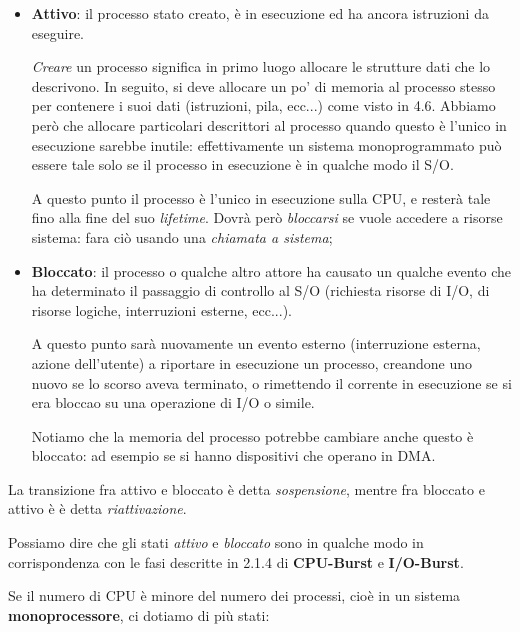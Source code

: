\documentclass[a4paper,11pt]{article}
\begin{document}
\begin{itemize}
	\item \textbf{Attivo}: il processo stato creato, è in esecuzione ed ha ancora istruzioni da eseguire. 

		\textit{Creare} un processo significa in primo luogo allocare le strutture dati che lo descrivono. In seguito, si deve allocare un po' di memoria al processo stesso per contenere i suoi dati (istruzioni, pila, ecc...) come visto in 4.6.
	Abbiamo però che allocare particolari descrittori al processo quando questo è l'unico in esecuzione sarebbe inutile: effettivamente un sistema monoprogrammato può essere tale solo se il processo in esecuzione è in qualche modo il S/O.

		A questo punto il processo è l'unico in esecuzione sulla CPU, e resterà tale fino alla fine del suo \textit{lifetime}.
		Dovrà però \textit{bloccarsi} se vuole accedere a risorse sistema: fara ciò usando una \textit{chiamata a sistema};

	\item \textbf{Bloccato}: il processo o qualche altro attore ha causato un qualche evento che ha determinato il passaggio di controllo al S/O (richiesta risorse di I/O, di risorse logiche, interruzioni esterne, ecc...).

		A questo punto sarà nuovamente un evento esterno (interruzione esterna, azione dell'utente) a riportare in esecuzione un processo, creandone uno nuovo se lo scorso aveva terminato, o rimettendo il corrente in esecuzione se si era bloccao su una operazione di I/O o simile.

		Notiamo che la memoria del processo potrebbe cambiare anche questo è bloccato: ad esempio se si hanno dispositivi che operano in DMA. 
\end{itemize}

La transizione fra attivo e bloccato è detta \textit{sospensione}, mentre fra bloccato e attivo è è detta \textit{riattivazione}.

Possiamo dire che gli stati \textit{attivo} e \textit{bloccato} sono in qualche modo in corrispondenza con le fasi descritte in 2.1.4 di \textbf{CPU-Burst} e \textbf{I/O-Burst}.

\par\bigskip

Se il numero di CPU è minore del numero dei processi, cioè in un sistema \textbf{monoprocessore}, ci dotiamo di più stati:
\end{document}
